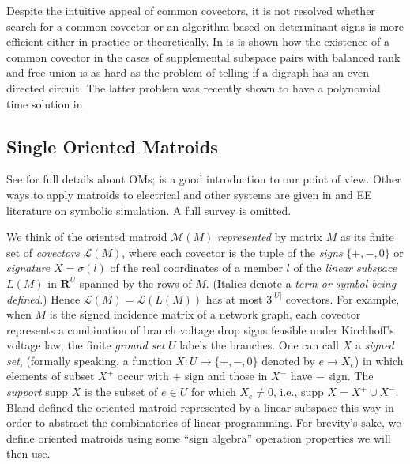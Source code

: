 \documentclass{amsproc-sunycstr}
\def\Reals{\ensuremath{\mathbf R}}
\theoremstyle{plain}
\theoremstyle{definition}
\theoremstyle{remark}
\newcommand{\supp}[1]{{{\mbox{supp\ }#1}}}
\newcommand{\extra}[1]{{{#1}}}
\begin{document}
\extra{
Despite the intuitive appeal of common covectors, it is not resolved
whether search for a common covector or an algorithm based on
determinant signs is more efficient either in practice or theoretically.
In \cite{sdcOMP} is is shown how the existence of a common covector
in the cases of supplemental subspace pairs with balanced rank and 
free union is as hard as the problem of telling if a digraph has
an even directed circuit.  The latter problem was recently shown to 
have a polynomial time solution in \cite{EvenCircSol:RobSeyTho}}

\subsection{Single Oriented Matroids}

See \cite{OMBOOK} for full details about OMs;
\cite{BachemKern} is a good introduction to our point of view.
Other ways to apply matroids to 
electrical and other systems are given in \cite{Recski,Murota,RigidityBook}
and EE literature on symbolic simulation\cite{SymSim}.  A full survey is omitted.

We think of the oriented matroid $\mathcal{M}(M)$ 
\textit{represented} by matrix $M$ 
as its finite set of \textit{covectors} $\mathcal{L}(M)$, where
each covector 
is the tuple of the \textit{signs} $\{+,-,0\}$
or \textit{signature} $X=\sigma(l)$ of the real coordinates 
of a member $l$ of the \textit{linear subspace} $L(M)$ in $\Reals^U$
spanned by the rows of $M$. 
(Italics denote a 
\textit{term or symbol being defined}.)  Hence 
$\mathcal{L}(M)=\mathcal{L}(L(M))$ has at most 
$3^{|U|}$ covectors.  
For example,
when $M$ is the signed incidence matrix of a network graph, each covector
represents a combination of branch voltage drop 
signs feasible under Kirchhoff's
voltage law; the finite \textit{ground set} $U$ labels the branches.
One can call $X$ a \textit{signed set}, 
(formally speaking, a function $X:U\rightarrow \{+,-,0\}$ denoted by
$e\rightarrow X_e$) in
which elements of subset $X^+$ occur with $+$ sign and those in $X^-$ have
$-$ sign. 
The \textit{support} $\supp{X}$ is the subset
of $e\in U$ for which $X_e \neq 0$, i.e., $\supp{X}=X^+\cup X^-$.
Bland \cite{BlandLP} 
defined the oriented matroid represented by a linear subspace
this way in order to abstract the combinatorics of linear 
programming.  
For brevity's sake,
we define oriented matroids 
using some ``sign algebra'' operation properties 
we will then use.
\end{document}
